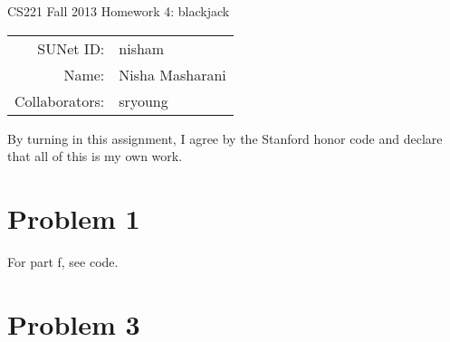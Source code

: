 \documentclass[12pt]{article}
\begin{document}
\begin{center}
{\Large CS221 Fall 2013 Homework 4: blackjack}

\begin{tabular}{rl}
SUNet ID: & nisham\\
Name: & Nisha Masharani \\
Collaborators: & sryoung \\
\end{tabular}
\end{center}

By turning in this assignment, I agree by the Stanford honor code and declare
that all of this is my own work.

\section*{Problem 1}
For part f, see code. 

\section*{Problem 3}
\end{document}
